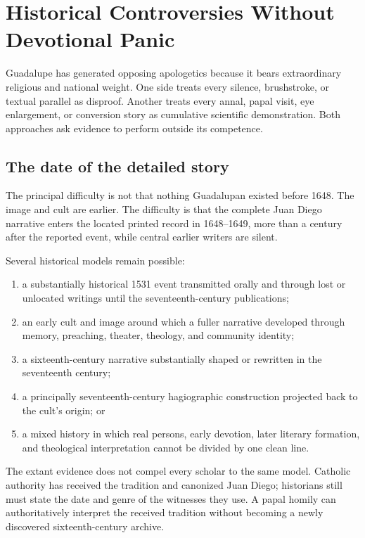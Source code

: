 \section{Historical Controversies Without Devotional Panic}

Guadalupe has generated opposing apologetics because it bears extraordinary religious and national weight. One side treats every silence, brushstroke, or textual parallel as disproof. Another treats every annal, papal visit, eye enlargement, or conversion story as cumulative scientific demonstration. Both approaches ask evidence to perform outside its competence.

\subsection{The date of the detailed story}

The principal difficulty is not that nothing Guadalupan existed before 1648. The image and cult are earlier. The difficulty is that the complete Juan Diego narrative enters the located printed record in 1648--1649, more than a century after the reported event, while central earlier writers are silent.

Several historical models remain possible:

\begin{enumerate}
  \item a substantially historical 1531 event transmitted orally and through lost or unlocated writings until the seventeenth-century publications;
  \item an early cult and image around which a fuller narrative developed through memory, preaching, theater, theology, and community identity;
  \item a sixteenth-century narrative substantially shaped or rewritten in the seventeenth century;
  \item a principally seventeenth-century hagiographic construction projected back to the cult's origin; or
  \item a mixed history in which real persons, early devotion, later literary formation, and theological interpretation cannot be divided by one clean line.
\end{enumerate}

The extant evidence does not compel every scholar to the same model. Catholic authority has received the tradition and canonized Juan Diego; historians still must state the date and genre of the witnesses they use. A papal homily can authoritatively interpret the received tradition without becoming a newly discovered sixteenth-century archive.

